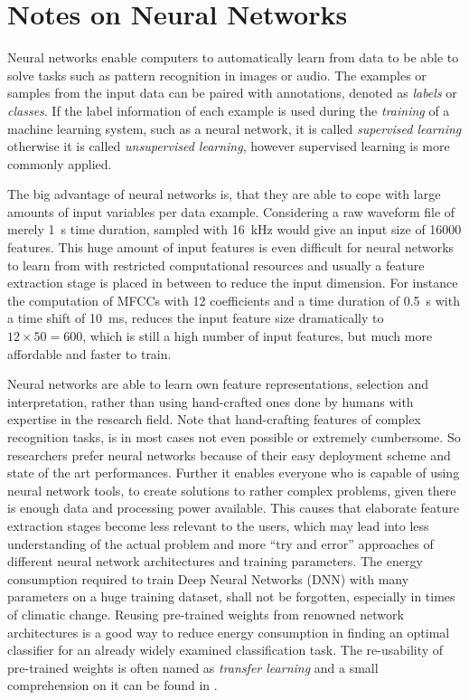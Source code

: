 
\section{Notes on Neural Networks}\label{sec:intro_nn}
Neural networks enable computers to automatically learn from data to be able to solve tasks such as pattern recognition in images or audio.
The examples or samples from the input data can be paired with annotations, denoted as \emph{labels} or \emph{classes}.
If the label information of each example is used during the \emph{training} of a machine learning system, such as a neural network, it is called \emph{supervised learning} otherwise it is called \emph{unsupervised learning}, however supervised learning is more commonly applied.

The big advantage of neural networks is, that they are able to cope with large amounts of input variables per data example.
Considering a raw waveform file of merely \SI{1}{s} time duration, sampled with \SI{16}{\kilo\hertz} would give an input size of 16000 features.
This huge amount of input features is even difficult for neural networks to learn from with restricted computational resources and usually a feature extraction stage is placed in between to reduce the input dimension.
For instance the computation of MFCCs with 12 coefficients and a time duration of \SI{0.5}{s} with a time shift of \SI{10}{\milli\second}, reduces the input feature size dramatically to $12 \times 50 = 600$, which is still a high number of input features, but much more affordable and faster to train.

Neural networks are able to learn own feature representations, selection and interpretation, rather than using hand-crafted ones done by humans with expertise in the research field.
Note that hand-crafting features of complex recognition tasks, is in most cases not even possible or extremely cumbersome.
So researchers prefer neural networks because of their easy deployment scheme and state of the art performances.
Further it enables everyone who is capable of using neural network tools, to create solutions to rather complex problems, given there is enough data and processing power available.
This causes that elaborate feature extraction stages become less relevant to the users, which may lead into less understanding of the actual problem and more \enquote{try and error} approaches of different neural network architectures and training parameters.
The energy consumption required to train Deep Neural Networks (DNN) with many parameters on a huge training dataset, shall not be forgotten, especially in times of climatic change.
Reusing pre-trained weights from renowned network architectures is a good way to reduce energy consumption in finding an optimal classifier for an already widely examined classification task.
The re-usability of pre-trained weights is often named as \emph{transfer learning} and a small comprehension on it can be found in \cite{TransferLearning}.

